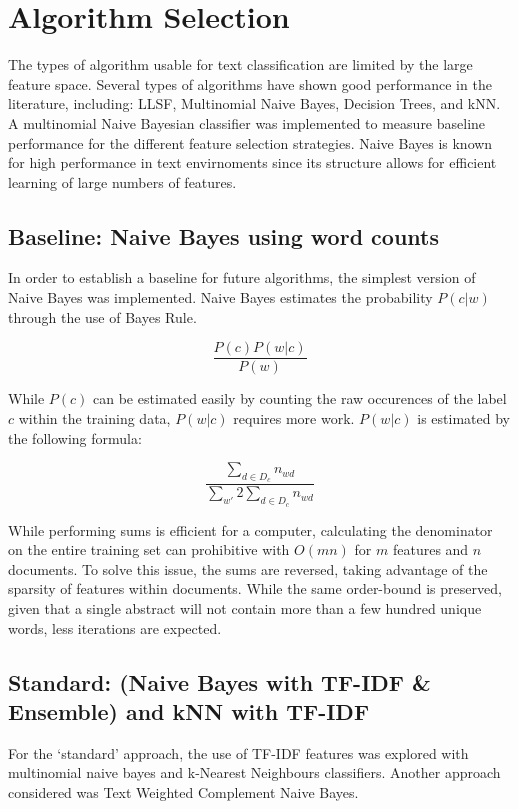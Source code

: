 \documentclass[10pt,twocolumn]{article}
\begin{document}
\section*{Algorithm Selection}

The types of algorithm usable for text classification are limited by the large feature space. Several types of algorithms have shown good performance in the literature, including: LLSF, Multinomial Naive Bayes, Decision Trees, and kNN. A multinomial Naive Bayesian classifier was implemented to measure baseline performance for the different feature selection strategies. Naive Bayes is known for high performance in text envirnoments since its structure allows for efficient learning of large numbers of features.

\subsection*{Baseline: Naive Bayes using word counts}

In order to establish a baseline for future algorithms, the simplest version of Naive Bayes was implemented. Naive Bayes estimates the probability $P(c|w)$ through the use of Bayes Rule.

\[ \frac {P(c)P(w|c)} {P(w)} \]

While $P(c)$ can be estimated easily by counting the raw occurences of the label $c$ within the training data, $P(w|c)$ requires more work. $P(w|c)$ is estimated by the following formula:

\[\frac {\sum_{d \in D_c} n_{wd}} {\sum_{w'} 2\sum_{d\in D_c} n_{wd}} \]

While performing sums is efficient for a computer, calculating the denominator on the entire training set can prohibitive with $O(mn)$ for $m$ features and $n$ documents. To solve this issue, the sums are reversed, taking advantage of the sparsity of features within documents. While the same order-bound is preserved, given that a single abstract will not contain more than a few hundred unique words, less iterations are expected.

\subsection*{Standard: (Naive Bayes with TF-IDF \& Ensemble) and kNN with TF-IDF}

For the `standard' approach, the use of TF-IDF features was explored with multinomial naive bayes and k-Nearest Neighbours classifiers. Another approach considered was Text Weighted Complement Naive Bayes.
\end{document}
